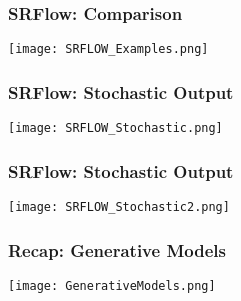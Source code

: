 \begin{frame}
    \frametitle{SRFlow: Comparison}
    \center\texttt{[image: SRFLOW\_Examples.png]}
\end{frame}

\begin{frame}
    \frametitle{SRFlow: Stochastic Output}
    \center\texttt{[image: SRFLOW\_Stochastic.png]}
\end{frame}

\begin{frame}
    \frametitle{SRFlow: Stochastic Output}
    \center\texttt{[image: SRFLOW\_Stochastic2.png]}
\end{frame}


\begin{frame}
    \frametitle{Recap: Generative Models}
    \center\texttt{[image: GenerativeModels.png]}
\end{frame}

